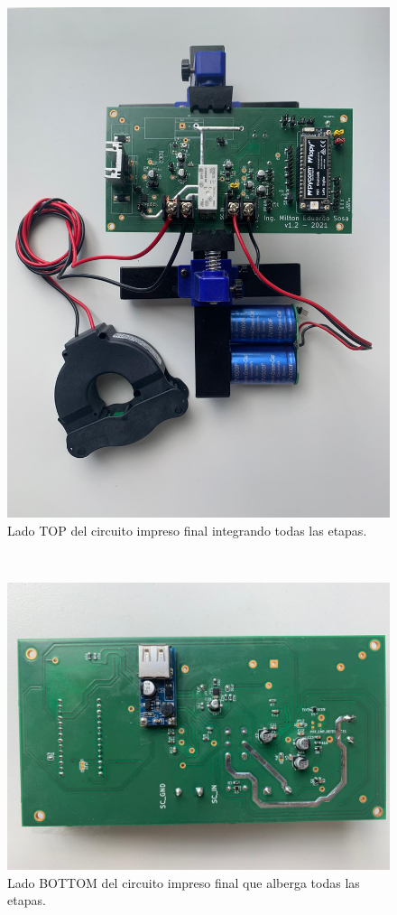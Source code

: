 \begin{figure}[h!]
	\centering
	\includegraphics[width=0.9\linewidth]{Figures/banco_prueba_e2e_2}
	\caption{Lado TOP del circuito impreso final integrando todas las etapas.}
	\label{fig:pcbfinaltop}
\end{figure}\\
\begin{figure}[h!]
	\centering
	\includegraphics[width=0.8\linewidth]{Figures/pcb_fina_bottom}
	\caption{Lado BOTTOM del circuito impreso final que alberga todas las etapas.}
	\label{fig:pcbfinabottom}
\end{figure}

